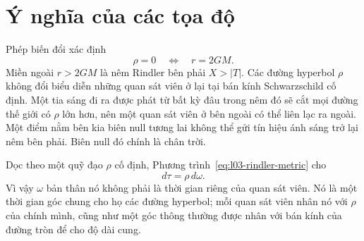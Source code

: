 \begin{classroomqa}
\end{classroomqa}

\section{Ý nghĩa của các tọa độ}

Phép biến đổi xác định
\begin{equation}
\rho=0\quad\Longleftrightarrow\quad r=2GM.
\end{equation}
Miền ngoài \(r>2GM\) là nêm Rindler bên phải \(X>|T|\). Các đường hyperbol \(\rho\) không đổi biểu diễn những quan sát viên ở lại tại bán kính Schwarzschild cố định. Một tia sáng đi ra được phát từ bất kỳ đâu trong nêm đó sẽ cắt mọi đường thế giới có \(\rho\) lớn hơn, nên một quan sát viên ở bên ngoài có thể liên lạc ra ngoài. Một điểm nằm bên kia biên null tương lai không thể gửi tín hiệu ánh sáng trở lại nêm bên phải. Biên null đó chính là chân trời.

\begin{classroomqa}
\end{classroomqa}

\begin{classroomqa}
\end{classroomqa}

Dọc theo một quỹ đạo \(\rho\) cố định, Phương trình~\eqref{eq:l03-rindler-metric} cho
\begin{equation}
d\tau=\rho\,d\omega.
\label{eq:l03-proper-time-rindler}
\end{equation}
Vì vậy \(\omega\) bản thân nó không phải là thời gian riêng của quan sát viên. Nó là một thời gian góc chung cho họ các đường hyperbol; mỗi quan sát viên nhân nó với \(\rho\) của chính mình, cũng như một góc thông thường được nhân với bán kính của đường tròn để cho độ dài cung.

